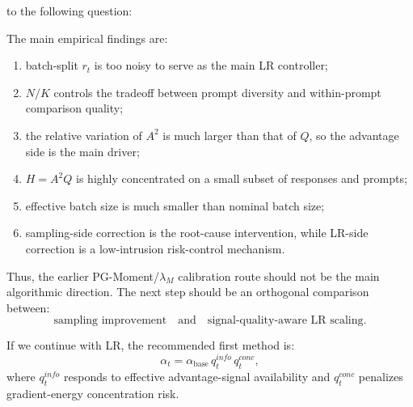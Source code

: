 \documentclass[11pt,a4paper]{article}
\begin{document}
to the following question:

\begin{center}
\end{center}

The main empirical findings are:
\begin{enumerate}[leftmargin=2em]
    \item batch-split \(r_t\) is too noisy to serve as the main LR controller;
    \item \(N/K\) controls the tradeoff between prompt diversity and within-prompt comparison quality;
    \item the relative variation of \(A^2\) is much larger than that of \(Q\), so the advantage side is the main driver;
    \item \(H=A^2Q\) is highly concentrated on a small subset of responses and prompts;
    \item effective batch size is much smaller than nominal batch size;
    \item sampling-side correction is the root-cause intervention, while LR-side correction is a low-intrusion risk-control mechanism.
\end{enumerate}

Thus, the earlier PG-Moment/\(\lambda_M\) calibration route should not be the main algorithmic direction. The next step should be an orthogonal comparison between:
\[
\boxed{
\text{sampling improvement}
}
\quad \text{and}\quad
\boxed{
\text{signal-quality-aware LR scaling}.
}
\]

If we continue with LR, the recommended first method is:
\[
\boxed{
\alpha_t
=
\alpha_{\mathrm{base}}\,
q_t^{info}\,
q_t^{conc},
}
\]
where \(q_t^{info}\) responds to effective advantage-signal availability and \(q_t^{conc}\) penalizes gradient-energy concentration risk.
\end{document}
